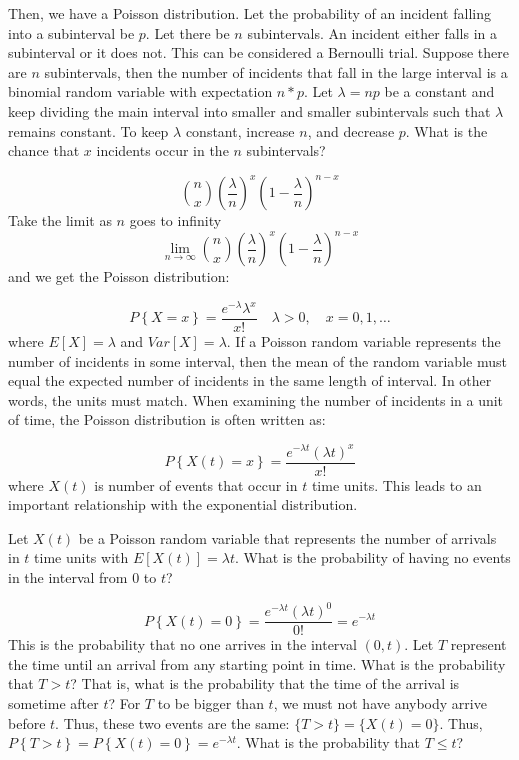 \documentclass[
]{book}
\theoremstyle{definition}
\theoremstyle{definition}
\theoremstyle{definition}
\theoremstyle{definition}
\theoremstyle{remark}
\begin{document}
Then, we have a Poisson distribution. Let the probability of an incident
falling into a subinterval be \(p\). Let there be \(n\) subintervals. An
incident either falls in a subinterval or it does not. This can be
considered a Bernoulli trial. Suppose there are \(n\) subintervals, then
the number of incidents that fall in the large interval is a binomial
random variable with expectation \(n*p\). Let \(\lambda = np\) be a constant
and keep dividing the main interval into smaller and smaller
subintervals such that \(\lambda\) remains constant. To keep \(\lambda\)
constant, increase \(n\), and decrease \(p\). What is the chance that \(x\)
incidents occur in the \(n\) subintervals?

\[
\binom{n}{x} \left( \frac{\lambda}{n} \right)^{x} \left(1- \frac{\lambda}{n} \right)^{n-x}
\]
Take the limit as \(n\) goes to infinity
\[
\lim\limits_{n\to\infty} \binom{n}{x} \left( \frac{\lambda}{n} \right)^{x} \left(1- \frac{\lambda}{n} \right)^{n-x}
\]
and we get the Poisson distribution:

\[
P\left\{X=x\right\} = \frac{e^{-\lambda}\lambda^{x}}{x!} \quad \lambda > 0, \quad x = 0, 1, \ldots
\]
where \(E\left[X\right] = \lambda\) and \(Var\left[X\right] = \lambda\). If a Poisson random variable represents the number of incidents in some interval, then the mean of
the random variable must equal the expected number of incidents in the
same length of interval. In other words, the units must match. When
examining the number of incidents in a unit of time, the Poisson
distribution is often written as:

\[
P\left\{X(t)=x\right\} = \frac{e^{-\lambda t}\left(\lambda t \right)^{x}}{x!}
\]
where \(X(t)\) is number of events that occur in \(t\) time units. This
leads to an important relationship with the exponential distribution.

Let \(X(t)\) be a Poisson random variable that represents the number of
arrivals in \(t\) time units with \(E\left[X(t)\right] = \lambda t\). What is the
probability of having no events in the interval from \(0\) to \(t\)?

\[
P\left\{X(t) = 0\right\} = \frac{e^{- \lambda t}(\lambda t)^{0}}{0!} = e^{- \lambda t}
\]
This is the probability that no one arrives in the interval \((0,t)\). Let
\(T\) represent the time until an arrival from any starting point in time.
What is the probability that \(T > t\)? That is, what is the probability
that the time of the arrival is sometime after \(t\)? For \(T\) to be bigger
than \(t\), we must not have anybody arrive before \(t\). Thus, these two
events are the same: \(\{T > t\} = \{X(t) = 0\}\). Thus,
\(P\left\{T > t \right\} = P\left\{X(t) = 0\right\} = e^{- \lambda t}\). What is the probability that \(T \le t\)?
\end{document}
